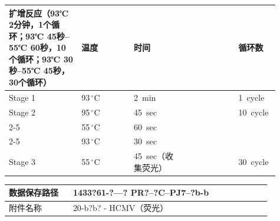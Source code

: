 \documentclass[UTF8,10pt,a4paper,fontset=fandol]{ctexart}
\newcommand{\fieldvalue}[1]{#1}
\newcommand{\handwritten}[1]{#1}
\begin{document}
\begin{tabular}{|p{0.25\linewidth}|p{0.18\linewidth}|p{0.18\linewidth}|p{0.18\linewidth}|p{0.12\linewidth}|}
\hline
扩增反应（93℃ 2分钟，1个循环；93℃ 45秒--55℃ 60秒，10个循环；93℃ 30秒--55℃ 45秒，30个循环） &
温度 & 时间 & & 循环数 \\
\hline
Stage 1 &
\fieldvalue{\handwritten{93}}\,${}^{\circ}$C &
\fieldvalue{\handwritten{2}}\ min & &
\fieldvalue{\handwritten{1}}\ cycle \\
\hline
Stage 2 &
\fieldvalue{\handwritten{95}}\,${}^{\circ}$C &
\fieldvalue{\handwritten{45}}\ sec & &
\fieldvalue{\handwritten{10}}\ cycle \\
\cline{2-5}
&
\fieldvalue{\handwritten{55}}\,${}^{\circ}$C &
\fieldvalue{\handwritten{60}}\ sec & & \\
\cline{2-5}
&
\fieldvalue{\handwritten{93}}\,${}^{\circ}$C &
\fieldvalue{\handwritten{30}}\ sec & & \\
\hline
Stage 3 &
\fieldvalue{\handwritten{55}}\,${}^{\circ}$C &
\fieldvalue{\handwritten{45}}\ sec（收集荧光） & &
\fieldvalue{\handwritten{30}}\ cycle \\
\hline
\end{tabular}

\vspace{0.5em}

\begin{tabular}{|p{0.22\linewidth}|p{0.68\linewidth}|}
\hline
数据保存路径 &
\fieldvalue{\handwritten{1433?61-?—? PR?--?C--PJ7--?b-b}} \\
\hline
附件名称 &
\fieldvalue{\handwritten{20-b?b? - HCMV（荧光）}} \\
\hline
\end{tabular}
\end{document}
